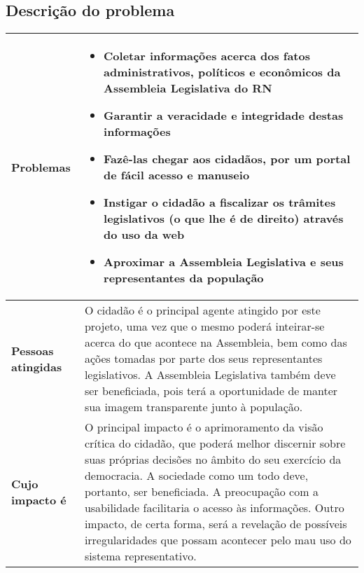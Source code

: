 \documentclass[12pt, a4paper]{article}
\begin{document}
        \subsection{Descrição do problema}
            \begin{tabu}{X[1] | X[3]}
                \hline

                \textbf{Problemas} &
                \begin{minipage}[t]{\linewidth}
                \begin{itemize}[itemsep=.5ex,parsep=.0ex,after=\strut]
                \item Coletar informações acerca dos fatos administrativos,
                    políticos e econômicos da Assembleia Legislativa do RN
                \item Garantir a veracidade e integridade destas informações
                \item Fazê-las chegar aos cidadãos, por um portal de fácil acesso
                    e manuseio
                \item Instigar o cidadão a fiscalizar os trâmites legislativos
                    (o que lhe é de direito) através do uso da web
                \item Aproximar a Assembleia Legislativa e seus representantes
                    da população
                \end{itemize}
                \end{minipage}
                \\ \hline

                \textbf{Pessoas atingidas} &
                O cidadão é o principal agente atingido por este projeto, uma
                vez que o mesmo poderá inteirar-se acerca do que acontece na
                Assembleia, bem como das ações tomadas por parte dos seus
                representantes legislativos. A Assembleia Legislativa também
                deve ser beneficiada, pois terá a oportunidade de manter sua
                imagem transparente junto à população.
                \\ \hline

                \textbf{Cujo impacto é} &
                O principal impacto é o aprimoramento da visão crítica do
                cidadão, que poderá melhor discernir sobre suas próprias
                decisões no âmbito do seu exercício da democracia. A sociedade
                como um todo deve, portanto, ser beneficiada. A preocupação com
                a usabilidade facilitaria o acesso às informações.  Outro
                impacto, de certa forma, será a revelação de possíveis
                irregularidades que possam acontecer pelo mau uso do sistema
                representativo.
                \\ \hline


\end{tabu}
\end{document}
